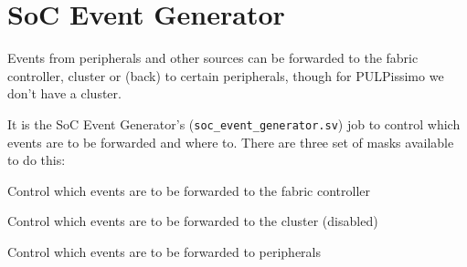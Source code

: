 \section{SoC Event Generator}

Events from peripherals and other sources can be forwarded to the
fabric controller, cluster or (back) to certain peripherals, though for
PULPissimo we don't have a cluster.

It is the SoC Event Generator's (\texttt{soc\_event\_generator.sv}) job to control which events are to be forwarded and where to.
There are three set of masks available to do this:
\begin{enumerate}[leftmargin=\widthof{[Peripheral Masks]}+\labelsep]
  \item[FC Masks] Control which events are to be forwarded to the fabric controller
  \item[Cluster Masks] Control which events are to be forwarded to the cluster (disabled)
  \item[Peripheral Masks] Control which events are to be forwarded to peripherals
\end{enumerate}


